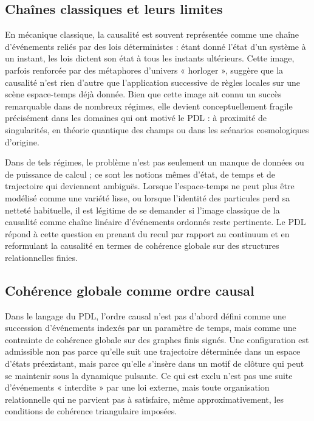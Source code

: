 \documentclass[11pt,a4paper]{article}
\theoremstyle{definition}
\begin{document}
\subsection{Chaînes classiques et leurs limites}

En mécanique classique, la causalité est souvent représentée comme une chaîne d’événements reliés par des lois déterministes : étant donné l’état d’un système à un instant, les lois dictent son état à tous les instants ultérieurs. Cette image, parfois renforcée par des métaphores d’univers « horloger », suggère que la causalité n’est rien d’autre que l’application successive de règles locales sur une scène espace-temps déjà donnée. Bien que cette image ait connu un succès remarquable dans de nombreux régimes, elle devient conceptuellement fragile précisément dans les domaines qui ont motivé le PDL : à proximité de singularités, en théorie quantique des champs ou dans les scénarios cosmologiques d’origine.\cite{Laubscher_EmergencePhysicalReality_2024,Laubscher_PDL_Position_2024}

Dans de tels régimes, le problème n’est pas seulement un manque de données ou de puissance de calcul ; ce sont les notions mêmes d’état, de temps et de trajectoire qui deviennent ambiguës. Lorsque l’espace-temps ne peut plus être modélisé comme une variété lisse, ou lorsque l’identité des particules perd sa netteté habituelle, il est légitime de se demander si l’image classique de la causalité comme chaîne linéaire d’événements ordonnés reste pertinente.\cite{Laubscher_Existence_PulsatingClosure_2026} Le PDL répond à cette question en prenant du recul par rapport au continuum et en reformulant la causalité en termes de cohérence globale sur des structures relationnelles finies.

\subsection{Cohérence globale comme ordre causal}

Dans le langage du PDL, l’ordre causal n’est pas d’abord défini comme une succession d’événements indexés par un paramètre de temps, mais comme une contrainte de cohérence globale sur des graphes finis signés.\cite{Laubscher_EmergencePhysicalReality_2024,Laubscher_EffectiveFields_2024} Une configuration est admissible non pas parce qu’elle suit une trajectoire déterminée dans un espace d’états préexistant, mais parce qu’elle s’insère dans un motif de clôture qui peut se maintenir sous la dynamique pulsante. Ce qui est exclu n’est pas une suite d’événements « interdite » par une loi externe, mais toute organisation relationnelle qui ne parvient pas à satisfaire, même approximativement, les conditions de cohérence triangulaire imposées.
\end{document}
